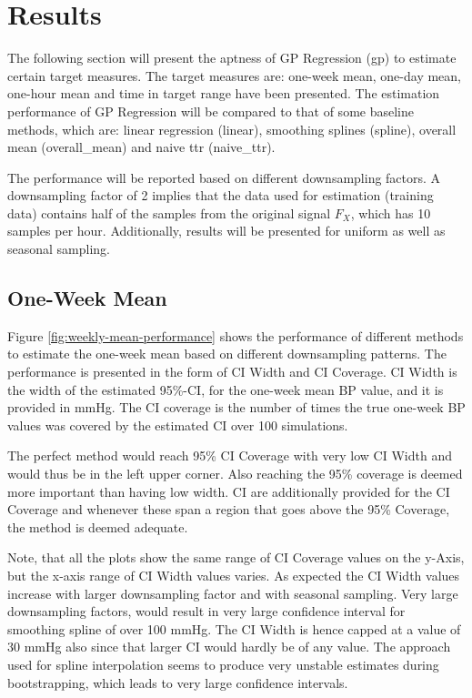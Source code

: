 \chapter{Results}\label{ch:results}

The following section will
present the aptness of GP Regression (gp) to estimate certain target measures.
The target measures are: one-week mean, one-day mean, one-hour mean and time in target
range have been presented.
The estimation performance of GP Regression will be compared to that of some
baseline methods, which are: linear regression (linear),
smoothing splines (spline), overall mean (overall\_mean) and naive ttr (naive\_ttr).

The performance will be reported based on different downsampling factors.
A downsampling factor of 2 implies that the data used for estimation
(training data) contains half of the samples from the original signal $F_X$,
which has 10 samples per hour.
Additionally, results will be presented for uniform as well as seasonal sampling.




\section{One-Week Mean}

Figure \ref{fig:weekly-mean-performance} shows the performance
of different methods to
estimate the one-week mean based on different downsampling patterns.
The performance is presented in the form of CI Width and CI Coverage.
CI Width is the width of the estimated 95\%-CI, for the
one-week mean BP value, and it is provided in mmHg.
The CI coverage is the number of times the true one-week BP values
was covered by the estimated CI over 100 simulations.


The perfect method would reach 95\% CI Coverage with very
low CI Width and would thus be in the left upper corner.
Also reaching the 95\% coverage is deemed more important
than having low width.
CI are additionally provided for the CI Coverage and whenever these
span a region that goes above the 95\% Coverage, the method is deemed adequate.


Note, that all the plots show the same range of CI Coverage values on
the y-Axis, but the x-axis range of CI Width values varies.
As expected the CI Width values increase with larger downsampling factor
and with seasonal sampling. Very large downsampling factors, would
result in very large confidence interval for smoothing spline of over
100 mmHg. The CI Width is hence capped at a value of 30 mmHg also since
that larger CI would hardly be of any value.
The approach used for spline interpolation seems to produce very
unstable estimates during bootstrapping, which leads to very large confidence intervals.

